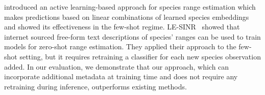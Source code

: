 \citet{lange2024active} introduced an active learning-based approach for species range estimation which makes predictions based on linear combinations of learned species embeddings and showed its effectiveness in the few-shot regime. 
LE-SINR~\citep{hamilton2024} showed that internet sourced free-form text descriptions of species' ranges can be used to train models for zero-shot range estimation. 
They applied their approach to the few-shot setting, but it requires retraining a classifier for each new species observation added. 
In our evaluation, we demonstrate that our \modelname approach, which can incorporate additional metadata at training time and does not require any retraining during inference, outperforms existing methods.  



\vspace{-8pt}